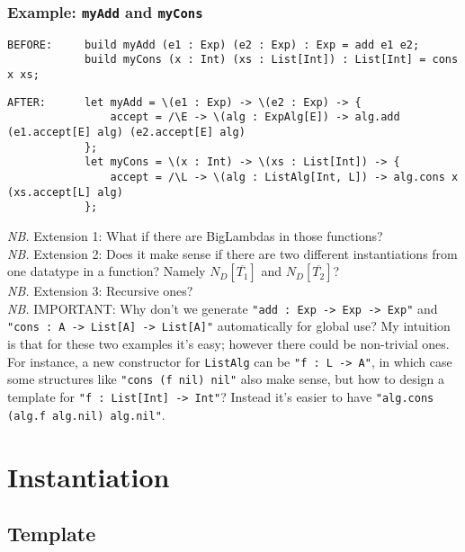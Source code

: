 \documentclass{article}
\newcommand{\nb}{\textit{NB. }}
\begin{document}
\begin{spacing}{1.1}
\subsubsection{Example: \lstinline{myAdd} and \lstinline{myCons}}

\begin{lstlisting}[numbers=none]
BEFORE:     build myAdd (e1 : Exp) (e2 : Exp) : Exp = add e1 e2;
            build myCons (x : Int) (xs : List[Int]) : List[Int] = cons x xs;
\end{lstlisting}
\begin{lstlisting}[numbers=none]
AFTER:      let myAdd = \(e1 : Exp) -> \(e2 : Exp) -> {
                accept = /\E -> \(alg : ExpAlg[E]) -> alg.add (e1.accept[E] alg) (e2.accept[E] alg)
            };
            let myCons = \(x : Int) -> \(xs : List[Int]) -> {
                accept = /\L -> \(alg : ListAlg[Int, L]) -> alg.cons x (xs.accept[L] alg)
            };
\end{lstlisting}

\nb Extension 1: What if there are BigLambdas in those functions?\\

\nb Extension 2: Does it make sense if there are two different instantiations from one datatype in a function? Namely $N_D[\overline{T_1}]$ and $N_D[\overline{T_2}]$?\\

\nb Extension 3: Recursive ones?\\

\nb IMPORTANT: Why don't we generate \lstinline{"add : Exp -> Exp -> Exp"} and \lstinline{"cons : A -> List[A] -> List[A]"} automatically for global use? My intuition is that for these two examples it's easy; however there could be non-trivial ones. For instance, a new constructor for \lstinline{ListAlg} can be \lstinline{"f : L -> A"}, in which case some structures like \lstinline{"cons (f nil)}\lstinline{ nil"} also make sense, but how to design a template for \lstinline{"f : List[Int] -> Int"}? Instead it's easier to have \lstinline{"alg.cons (alg.f alg.nil)}\lstinline{ alg.nil"}.

\section{Instantiation}

\subsection{Template}


\end{spacing}
\end{document}
